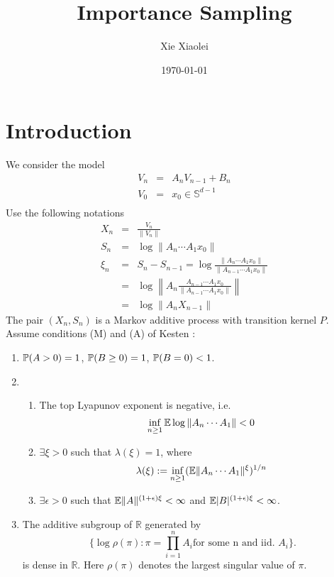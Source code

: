 \documentclass{article}
\title{Importance Sampling}
\author{Xie Xiaolei}
\date{\today}
\theoremstyle{remark}
\begin{document}
\maketitle
\section{Introduction}
We consider the model
\begin{eqnarray*}
V_n &=& A_n V_{n-1} + B_n\\
V_0 &=& x_0 \in \mathbb S^{d-1}\\
\end{eqnarray*}
Use the following notations
\begin{eqnarray*}
X_n &=& \frac{V_n}{\|V_n\|} \\
S_n &=& \log \|A_n \cdots A_1 x_0\| \\
\xi_n &=& S_n - S_{n-1} = \log\frac{\|A_n \cdots A_1 x_0\|}{\|A_{n-1}
  \cdots A_1 x_0\|} \\
&=& \log\left\| A_n \frac{A_{n-1} \cdots A_1 x_0}{\|A_{n-1} \cdots A_1
    x_0\|} \right\|\\
&=& \log \|A_n X_{n-1}\|
\end{eqnarray*}
The pair $(X_n, S_n)$ is a Markov additive process with transition
kernel $P$. Assume conditions (M) and (A) of Kesten \cite{Kesten1973}:
\begin{enumerate}
  \item $\P(A > 0) = 1$, $\P(B \geq 0) = 1$, $\P(B = 0) < 1$.
   
\item
  \begin{enumerate}
  \item The top Lyapunov exponent is negative, i.e.
    \begin{equation}
      \label{eq:neg_top_Lyapunov}
      \inf_{n \geq 1} \E \log \|A_n \cdots A_1\| < 0    
    \end{equation}
  \item $\exists \xi > 0$ such that $\lambda(\xi) = 1$, where
    $$
    \lambda(\xi) := \inf_{n \geq 1} (\E \|A_n \cdots A_1\|^\xi)^{1/n}
    $$
    \item $\exists \epsilon > 0$ such that $\E \|A\|^{(1 + \epsilon)\xi} <
      \infty$ and $\E |B|^{(1 + \epsilon)\xi} < \infty$.
  \end{enumerate}
  \item The additive subgroup of $\mathbb R$ generated by
    \[
    \{\log \rho(\pi): \pi = \prod_{i=1}^n A_i \text{for some n and
      iid. } A_i\}.
    \]
    is dense in $\mathbb R$. Here $\rho(\pi)$ denotes the largest
    singular value of $\pi$.
\end{enumerate}
\end{document}
